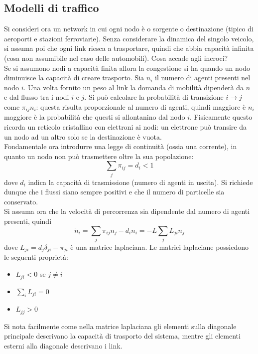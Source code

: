 \documentclass[12pt, a4paper]{book}
\theoremstyle{theorem}
\begin{document}
			\subsection{Modelli di traffico}
				Si consideri ora un network in cui ogni nodo è o sorgente o destinazione (tipico di aeroporti e stazioni ferroviarie).
				Senza considerare la dinamica del singolo veicolo, si assuma poi che ogni link riesca a trasportare, quindi che abbia capacità infinita (cosa non assumibile nel caso delle automobili).
				Cosa accade agli incroci?\\
				Se si assumono nodi a capacità finita allora la congestione si ha quando un nodo diminuisce la capacità di creare trasporto.
				Sia $n_i$ il numero di agenti presenti nel nodo $i$.
				Una volta fornito un peso al link la domanda di mobilità dipenderà da $n$ e dal flusso tra i nodi $i$ e $j$.
				Si può calcolare la probabilità di transizione $i\to j$ come $\pi_{ij}n_i$: questa risulta proporzionale al numero di agenti, quindi maggiore è $n_i$ maggiore è la probabilità che questi si allontanino dal nodo $i$.
				Fisicamente questo ricorda un reticolo cristallino con elettroni ai nodi: un elettrone può transire da un nodo ad un altro solo se la destinazione è vuota.\\
				Fondamentale ora introdurre una legge di continuità (ossia una corrente), in quanto un nodo non può trasmettere oltre la sua popolazione:
				\begin{equation}
					\sum_j\pi_{ij}=d_i<1
				\end{equation}
				dove $d_i$ indica la capacità di trasmissione (numero di agenti in uscita).
				Si richiede dunque che i flussi siano sempre positivi e che il numero di particelle sia conservato.\\
				Si assuma ora che la velocità di percorrenza sia dipendente dal numero di agenti presenti, quindi
				\begin{equation*}
					\dot{n}_i=\sum_j\pi_{ij}n_j-d_in_i=-L\sum_jL_{ji}n_j
				\end{equation*}
				dove $L_{ji}=d_j\delta_{ji}-\pi_{ji}$ è una matrice laplaciana.
				Le matrici laplaciane possiedono le seguenti proprietà:
				\begin{itemize}
					\item $L_{ji}<0$ se $j\neq i$
					\item $\sum_iL_{ji}=0$
					\item $L_{jj}>0$
				\end{itemize}
				Si nota facilmente come nella matrice laplaciana gli elementi sulla diagonale principale descrivano la capacità di trasporto del sistema, mentre gli elementi esterni alla diagonale descrivano i link.
\end{document}

